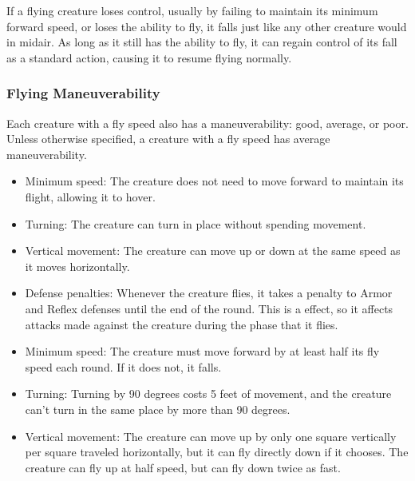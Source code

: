          If a flying creature loses control, usually by failing to maintain its minimum forward speed, or loses the ability to fly, it falls just like any other creature would in midair. As long as it still has the ability to fly, it can regain control of its fall as a standard action, causing it to resume flying normally.

        \subsubsection{Flying Maneuverability}\label{Flying Maneuverability}
        Each creature with a fly speed also has a maneuverability: good, average, or poor.
        Unless otherwise specified, a creature with a fly speed has average maneuverability.

            \begin{itemize}
                \item Minimum speed: The creature does not need to move forward to maintain its flight, allowing it to hover.
                \item Turning: The creature can turn in place without spending movement.
                \item Vertical movement: The creature can move up or down at the same speed as it moves horizontally.
            \end{itemize}

            \begin{itemize}
                \item Defense penalties: Whenever the creature flies, it takes a  penalty to Armor and Reflex defenses until the end of the round.
                    This is a  effect, so it affects attacks made against the creature during the phase that it flies.
                \item Minimum speed: The creature must move forward by at least half its fly speed each round. If it does not, it falls.
                \item Turning: Turning by 90 degrees costs 5 feet of movement, and the creature can't turn in the same place by more than 90 degrees.
                \item Vertical movement: The creature can move up by only one square vertically per square traveled horizontally, but it can fly directly down if it chooses.
                    The creature can fly up at half speed, but can fly down twice as fast.
            \end{itemize}

